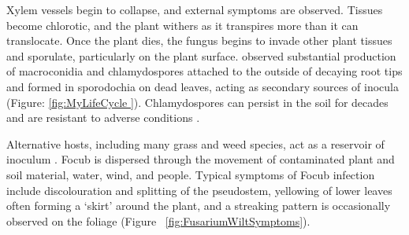 Xylem vessels begin to collapse, and external symptoms are observed. Tissues become chlorotic, and the plant withers as it transpires more than it can translocate. Once the plant dies, the fungus begins to invade other plant tissues and sporulate, particularly on the plant surface. \textcite{Warman2018} observed substantial production of macroconidia and chlamydospores attached to the outside of decaying root tips and formed in sporodochia on dead leaves, acting as secondary sources of inocula \parencite{ohara2004ren1} (Figure: \ref{fig:MyLifeCycle
}). Chlamydospores can persist in the soil for decades and are resistant to adverse conditions \parencite{Pegg2019}. 

Alternative hosts, including many grass and weed species, act as a reservoir of inoculum \parencite{Hennessy2005}.  \ac{Focub} is dispersed through the movement of contaminated plant and soil material, water, wind, and people. Typical symptoms of \ac{Focub} infection include discolouration and splitting of the pseudostem, yellowing of lower leaves often forming a ‘skirt’ around the plant, and a streaking pattern is occasionally observed on the foliage (Figure ~\ref{fig:FusariumWiltSymptoms}). 

